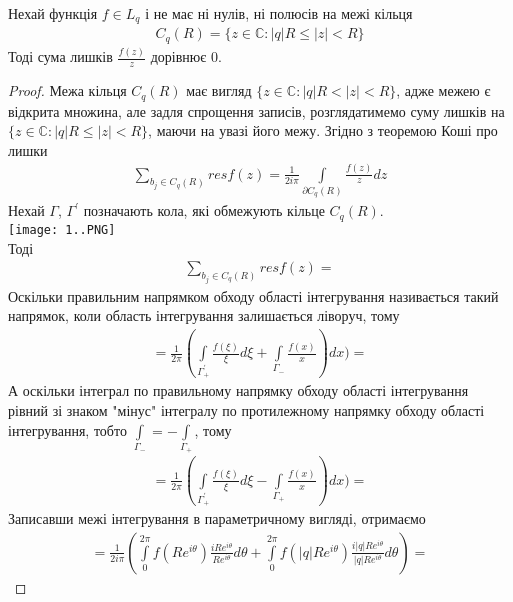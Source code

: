 \documentclass[12pt,a4paper]{article}
\begin{document}
 
\begin{thm}
 Нехай функція $f\in L_{q}$ і не має ні нулів, ні полюсів на межі кільця 
\begin{equation}\label{th21}
\begin{array}{l}
C_{q}(R)=\lbrace z\in \mathbb{C}:\left |q  \right |R\leq \left |z  \right |<R \rbrace
\end{array}
\end{equation} \label{C_{q}(R)}
 Тоді сума лишків $\frac{f(z)}{z}$ дорівнює $0$.
\end{thm}
\begin{proof}
 Межа кільця $C_{q}(R)$ має вигляд $\lbrace z\in \mathbb{C}:\left |q  \right |R< \left |z  \right |<R \rbrace$, адже межею є відкрита множина, але задля спрощення записів, розглядатимемо суму лишків на $\lbrace z\in \mathbb{C}:\left |q  \right |R\leq \left |z  \right |<R \rbrace$, маючи на увазі його межу. Згідно з теоремою Коші про лишки
 \[\begin{array}{l}
\sum \limits_{ b_{j}\in C_{q}(R)} resf(z)= \frac{1}{2i\pi}\int \limits_{\partial C_{q}(R)} \frac{f(z)}{z}dz
\end{array} \]
Нехай $\Gamma$, $\Gamma^{'}$ позначають кола, які обмежують кільце $C_{q}(R)$.\\
\texttt{[image: 1..PNG]}\\
Тоді 
\[\begin{array}{l}
\sum_{b_{j} \in C_{q}(R)}^{ } resf(z) = 
\end{array} \]
Оскільки правильним напрямком обходу області інтегрування називається такий
напрямок, коли область інтегрування залишається ліворуч, тому
\[\begin{array}{l}
=\frac{1}{2\pi}(\int\limits_{\Gamma^{'}_{+}} \frac{f(\xi)}{\xi}d\xi + \int\limits_{\Gamma_{-}}\frac{f(x)}{x})dx)=
\end{array} \]
А оскільки інтеграл по правильному напрямку обходу області інтегрування рівний зі знаком "мінус" інтегралу по протилежному напрямку обходу області інтегрування, тобто $\int\limits_{\Gamma_{-}}= - \int\limits_{\Gamma_{+}}$, тому 
\[\begin{array}{l}
=\frac{1}{2\pi}(\int\limits_{\Gamma^{'}_{+}} \frac{f(\xi)}{\xi}d\xi - \int\limits_{\Gamma_{+}}\frac{f(x)}{x})dx)=
\end{array} \]
 Записавши межі інтегрування в параметричному вигляді, отримаємо 
 \[\begin{array}{l}
 = \frac{1}{2i\pi}(\int\limits_{0}^{2\pi }f(Re^{i\theta})\frac{iRe^{i\theta}}{Re^{i\theta }}d\theta  + \int\limits_{0}^{2\pi }f(\left |q \right |Re^{i\theta })\frac{i\left |q \right |Re^{i\theta }}{\left |q \right |Re^{i\theta }}d\theta)=

\end{array}\]
\end{proof}
\end{document}
